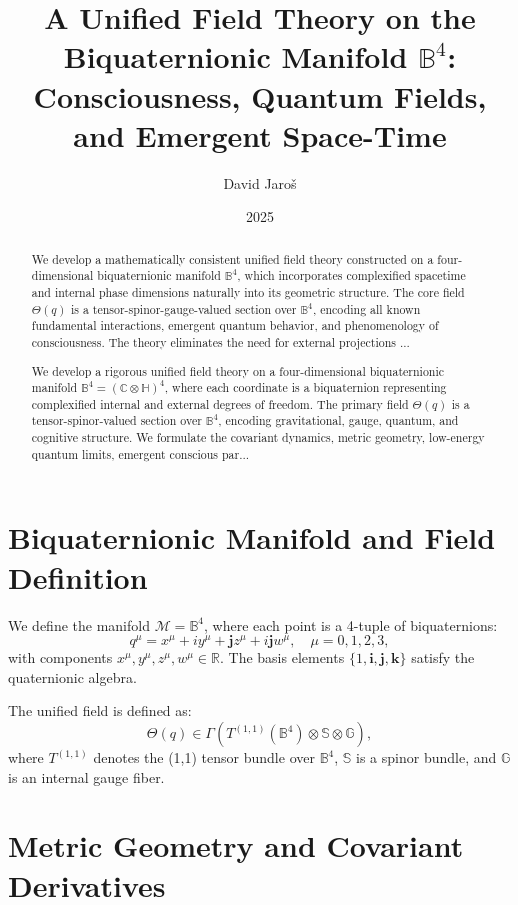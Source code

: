 \documentclass[12pt]{article}
\title{A Unified Field Theory on the Biquaternionic Manifold \( \mathbb{B}^4 \): Consciousness, Quantum Fields, and Emergent Space-Time}
\author{David Jaroš}
\date{2025}
\begin{document}
\maketitle

\begin{abstract}
We develop a mathematically consistent unified field theory constructed on a four-dimensional biquaternionic manifold \( \mathbb{B}^4 \), which incorporates complexified spacetime and internal phase dimensions naturally into its geometric structure. The core field \( \Theta(q) \) is a tensor-spinor-gauge-valued section over \( \mathbb{B}^4 \), encoding all known fundamental interactions, emergent quantum behavior, and phenomenology of consciousness. The theory eliminates the need for external projections ...

We develop a rigorous unified field theory on a four-dimensional biquaternionic manifold \( \mathbb{B}^4 = (\mathbb{C} \otimes \mathbb{H})^4 \), where each coordinate is a biquaternion representing complexified internal and external degrees of freedom. The primary field \( \Theta(q) \) is a tensor-spinor-valued section over \( \mathbb{B}^4 \), encoding gravitational, gauge, quantum, and cognitive structure. We formulate the covariant dynamics, metric geometry, low-energy quantum limits, emergent conscious par...
\end{abstract}

\section{Biquaternionic Manifold and Field Definition}

We define the manifold \( \mathcal{M} = \mathbb{B}^4 \), where each point is a 4-tuple of biquaternions:
\[
q^\mu = x^\mu + i y^\mu + \mathbf{j} z^\mu + i \mathbf{j} w^\mu, \quad \mu = 0,1,2,3,
\]
with components \( x^\mu, y^\mu, z^\mu, w^\mu \in \mathbb{R} \). The basis elements \( \{1, \mathbf{i}, \mathbf{j}, \mathbf{k}\} \) satisfy the quaternionic algebra.

The unified field is defined as:
\[
\Theta(q) \in \Gamma \left( T^{(1,1)}(\mathbb{B}^4) \otimes \mathbb{S} \otimes \mathbb{G} \right),
\]
where \( T^{(1,1)} \) denotes the (1,1) tensor bundle over \( \mathbb{B}^4 \), \( \mathbb{S} \) is a spinor bundle, and \( \mathbb{G} \) is an internal gauge fiber.

\section{Metric Geometry and Covariant Derivatives}
\end{document}
